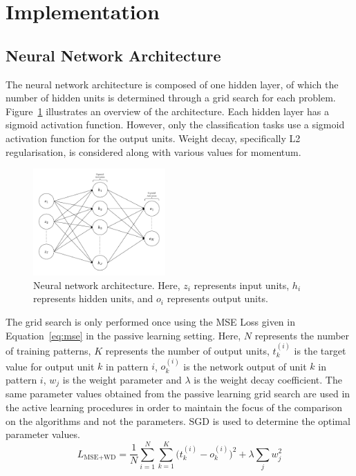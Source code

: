 \documentclass[10pt, conference]{IEEEtran}
\begin{document}
\section{Implementation}

\subsection{Neural Network Architecture}
The neural network architecture is composed of one hidden layer, of which the number of hidden units is determined through a grid search for each problem. Figure~\ref{fig:nnarch} illustrates an overview of the architecture. Each hidden layer has a sigmoid activation function. However, only the classification tasks use a sigmoid activation function for the output units. Weight decay, specifically L2 regularisation, is considered along with various values for momentum.

\begin{figure}[htbp]
	\centering
	\includegraphics[width=0.45\textwidth]{images/NNarch.pdf}
	\caption{Neural network architecture. Here, $z_i$ represents input units, $h_i$ represents hidden units, and $o_i$ represents output units.}
	\label{fig:nnarch}
\end{figure}

The grid search is only performed once using the MSE Loss given in Equation~\ref{eq:mse} in the passive learning setting. Here, $N$ represents the number of training patterns, $K$ represents the number of output units, $t_k^{(i)}$ is the target value for output unit $k$ in pattern $i$, $o_k^{(i)}$ is the network output of unit $k$ in pattern $i$, $w_j$ is the weight parameter and $\lambda$ is the weight decay coefficient. The same parameter values obtained from the passive learning grid search are used in the active learning procedures in order to maintain the focus of the comparison on the algorithms and not the parameters. SGD is used to determine the optimal parameter values.
\begin{equation}
L_{\text{MSE+WD}} = \frac{1}{N} \sum_{i=1}^{N} \sum_{k=1}^{K} \big( t_{k}^{(i)} - o_{k}^{(i)} \big)^2
+\lambda \sum_{j} w_j^2
\label{eq:mse}
\end{equation}
\end{document}

